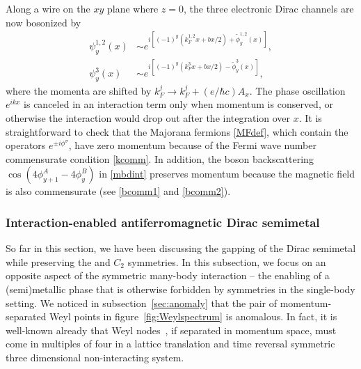 Along a wire on the $xy$ plane where $z=0$, the three electronic Dirac channels are now bosonized by \begin{align}\psi_y^{1,2}(x)&\sim e^{i[(-1)^y(k_F^{1,2}x+bx/2)+\tilde\phi_y^{1,2}(x)]},\\\psi_y^3(x)&\sim e^{i[(-1)^y(k_F^3x+bx/2)-\tilde\phi_y^3(x)]},\nonumber\end{align} where the momenta are shifted by $k_F^j\to k_F^j+(e/\hbar c)A_x$. The phase oscillation $e^{ikx}$ is canceled in an interaction term only when momentum is conserved, or otherwise the interaction would drop out after the integration over $x$. It is straightforward to check that the Majorana fermions \eqref{MFdef}, which contain the operators $e^{\pm i\phi^\sigma}$, have zero momentum because of the Fermi wave number commensurate condition \eqref{kcomm}. In addition, the boson backscattering $\cos(4\phi^A_{y+1}-4\phi^B_y)$ in \eqref{mbdint} preserves momentum because the magnetic field is also commensurate (see \eqref{bcomm1} and \eqref{bcomm2}).


\subsubsection{Interaction-enabled antiferromagnetic Dirac semimetal}\label{sec:intenable}
So far in this section, we have been discussing the gapping of the Dirac semimetal while preserving the \AFTR and $C_2$ symmetries. In this subsection, we focus on an opposite aspect of the symmetric many-body interaction -- the enabling of a (semi)metallic phase that is otherwise forbidden by symmetries in the single-body setting. We noticed in subsection~\ref{sec:anomaly} that the pair of momentum-separated Weyl points in figure~\ref{fig:Weylspectrum} is anomalous. In fact, it is well-known already that Weyl nodes~\cite{Murakami2007,WanVishwanathSavrasovPRB11,YangLuRan11,burkovBalenstPRL11,Ashvin_Weyl_review}, if separated in momentum space, must come in multiples of four in a lattice translation and time reversal symmetric three dimensional non-interacting system. 

